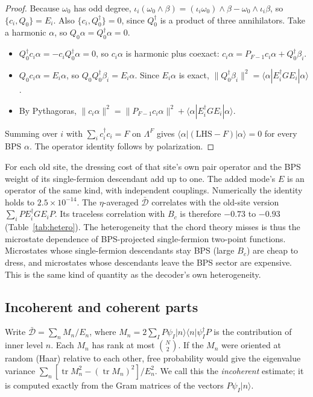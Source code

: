 \documentclass[11pt]{article}
\newcommand{\tr}{\operatorname{tr}}
\newcommand{\Dbar}{\bar{\mathcal D}}
\theoremstyle{plain}
\theoremstyle{remark}
\numberwithin{equation}{section}
\begin{document}
\begin{proof}
Because $\omega_0$ has odd degree, $\iota_i(\omega_0\wedge\beta)=(\iota_i\omega_0)\wedge\beta-\omega_0\wedge\iota_i\beta$,
so $\{c_i,Q_0\}=E_i$. Also $\{c_i,Q_0^\dagger\}=0$, since $Q_0^\dagger$ is a product of three annihilators. Take a
harmonic $\alpha$, so $Q_0\alpha=Q_0^\dagger\alpha=0$.
\begin{itemize}\itemsep1pt
\item $Q_0^\dagger c_i\alpha=-c_iQ_0^\dagger\alpha=0$, so $c_i\alpha$ is harmonic plus coexact:
  $c_i\alpha=P_{F-1}c_i\alpha+Q_0^\dagger\beta_i$.
\item $Q_0c_i\alpha=E_i\alpha$, so $Q_0Q_0^\dagger\beta_i=E_i\alpha$. Since $E_i\alpha$ is exact,
  $\|Q_0^\dagger\beta_i\|^2=\langle\alpha|E_i^\dagger GE_i|\alpha\rangle$.
\item By Pythagoras, $\|c_i\alpha\|^2=\|P_{F-1}c_i\alpha\|^2+\langle\alpha|E_i^\dagger GE_i|\alpha\rangle$.
\end{itemize}
Summing over $i$ with $\sum_ic_i^\dagger c_i=F$ on $\Lambda^F$ gives $\langle\alpha|(\text{LHS}-F)|\alpha\rangle=0$
for every BPS $\alpha$. The operator identity follows by polarization.
\end{proof}

For each old site, the dressing cost of that site's own pair operator and the BPS weight of its single-fermion
descendant add up to one. The added mode's $E$ is an operator of the same kind, with independent couplings. Numerically
the identity holds to $2.5\times10^{-14}$. The $\eta$-averaged $\Dbar$ correlates with the old-site version
$\sum_iPE_i^\dagger GE_iP$. Its traceless correlation with $B_c$ is therefore $-0.73$ to $-0.93$
(Table~\ref{tab:hetero}). The heterogeneity that the chord theory misses is thus the microstate dependence of
BPS-projected single-fermion two-point functions. Microstates whose single-fermion descendants stay BPS (large $B_c$)
are cheap to dress, and microstates whose descendants leave the BPS sector are expensive. This is the same kind of
quantity as the decoder's own heterogeneity.

\subsection{Incoherent and coherent parts}

Write $\Dbar=\sum_nM_n/E_n$, where $M_n=2\sum_IP\psi_I|n\rangle\langle n|\psi_I^\dagger P$ is the contribution of
inner level $n$. Each $M_n$ has rank at most $\binom N2$. If the $M_n$ were oriented at random (Haar) relative to each
other, free probability would give the eigenvalue variance $\sum_n[\tr M_n^2-(\tr M_n)^2]/E_n^2$. We call this the
\emph{incoherent} estimate; it is computed exactly from the Gram matrices of the vectors $P\psi_I|n\rangle$.
\end{document}
